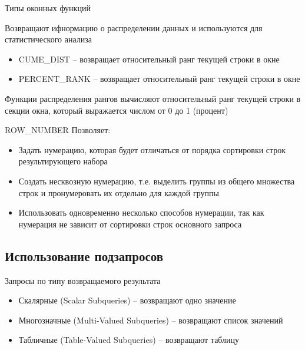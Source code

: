 \documentclass[12pt]{article}
\begin{document}
\begin{nota}{Типы оконных функций}
\begin{itemize}
        Возвращают ифнормацию о распределении данных и используются для статистического анализа 

        \begin{itemize}
            \item CUME\_DIST -- возвращает относительный ранг текущей строки в окне 
            \item PERCENT\_RANK -- возвращает относительный ранг текущей строки в окне 
        \end{itemize}

        Функции распределения рангов вычисляют относительный ранг текущей строки в секции окна, который выражается числом от 0 до 1 (процент)
    \end{itemize}
\end{nota}

\begin{defin}{ROW\_NUMBER}
    Позволяет: 

    \begin{itemize}
        \item Задать нумерацию, которая будет отличаться от порядка сортировки строк результирующего набора 
        \item Создать несквозную нумерацию, т.е. выделить группы из общего множества строк и пронумеровать их отдельно для каждой группы 
        \item Использовать одновременно несколько способов нумерации, так как нумерация не зависит от сортировки строк основного запроса 
    \end{itemize}
\end{defin}

\newpage

\subsection{Использование подзапросов}

\begin{nota}{Запросы по типу возвращаемого результата}
    \begin{itemize}
        \item Скалярные (Scalar Subqueries) -- возвращают одно значение 
        \item Многозначные (Multi-Valued Subqueries) -- возвращают список значений 
        \item Табличные (Table-Valued Subqueries) -- возвращают таблицу 
    \end{itemize}
\end{nota}
\end{document}
